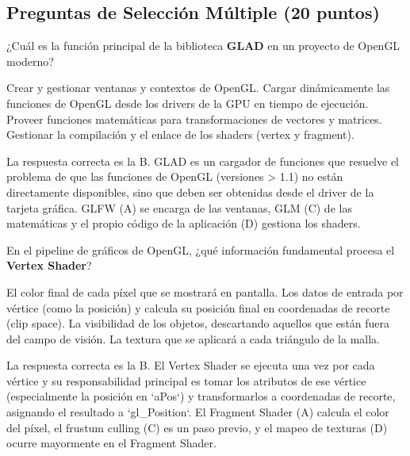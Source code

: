 \documentclass[addpoints,10pt]{exam}
\begin{document}
	\begin{questions}
		
	\part{Preguntas de Selección Múltiple (20 puntos)}
	
	\question[4]
	¿Cuál es la función principal de la biblioteca \textbf{GLAD} en un proyecto de OpenGL moderno?
	\begin{oneparchoices}
		\choice Crear y gestionar ventanas y contextos de OpenGL.
		\choice Cargar dinámicamente las funciones de OpenGL desde los drivers de la GPU en tiempo de ejecución.
		\choice Proveer funciones matemáticas para transformaciones de vectores y matrices.
		\choice Gestionar la compilación y el enlace de los shaders (vertex y fragment).
	\end{oneparchoices}
	\begin{solution}
	La respuesta correcta es la B. GLAD es un cargador de funciones que resuelve el problema de que las funciones de OpenGL (versiones > 1.1) no están directamente disponibles, sino que deben ser obtenidas desde el driver de la tarjeta gráfica. GLFW (A) se encarga de las ventanas, GLM (C) de las matemáticas y el propio código de la aplicación (D) gestiona los shaders.
	\end{solution}

	\question[4]
	En el pipeline de gráficos de OpenGL, ¿qué información fundamental procesa el \textbf{Vertex Shader}?
	\begin{oneparchoices}
		\choice El color final de cada píxel que se mostrará en pantalla.
		\choice Los datos de entrada por vértice (como la posición) y calcula su posición final en coordenadas de recorte (clip space).
		\choice La visibilidad de los objetos, descartando aquellos que están fuera del campo de visión.
		\choice La textura que se aplicará a cada triángulo de la malla.
	\end{oneparchoices}
	\begin{solution}
	La respuesta correcta es la B. El Vertex Shader se ejecuta una vez por cada vértice y su responsabilidad principal es tomar los atributos de ese vértice (especialmente la posición en `aPos`) y transformarlos a coordenadas de recorte, asignando el resultado a `gl_Position`. El Fragment Shader (A) calcula el color del píxel, el frustum culling (C) es un paso previo, y el mapeo de texturas (D) ocurre mayormente en el Fragment Shader.
	\end{solution}


\end{questions}
\end{document}
